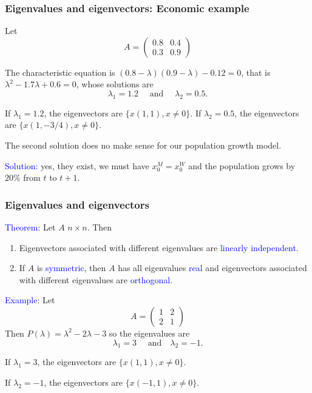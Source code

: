 \documentclass[11pt,aspectratio=169]{beamer}
\begin{document}
\begin{frame}
\frametitle{Eigenvalues and eigenvectors: Economic example}
\begin{small}
Let$$A=\begin{pmatrix}
0.8 & 0.4  \\
0.3 & 0.9
\end{pmatrix}$$

The characteristic equation is $(0.8-\lambda)(0.9-\lambda)-0.12=0$, that is $\lambda^2-1.7\lambda+0.6=0$, whose solutions  are $$\lambda_1=1.2\quad \text{ and } \quad\lambda_2=0.5.$$

If  $\lambda_1=1.2$, the eigenvectors are $\{x(1,1), x\neq 0\}$.
\vskip 10pt
If  $\lambda_2=0.5$, the eigenvectors are $\{x(1,-3/4), x\neq 0\}$.

\begin{tiny}The second solution does no make sense for our population growth model.\end{tiny}
\vskip 12pt
\textcolor{blue}{Solution:} yes, they exist, we must  have $x_0^M=x_0^ W$ and the  population grows by $20\%$ from $t$ to $t+1$.

\end{small}
\end{frame}


\begin{frame}
\frametitle{Eigenvalues and eigenvectors }
\begin{small}
\textcolor{blue}{Theorem:} Let $A$ $n \times n$. Then
\begin{enumerate}
\item Eigenvectors associated with different eigenvalues are \textcolor{blue}{linearly independent}.

\item If $A$ is \textcolor{blue}{symmetric}, then $A$ has all eigenvalues \textcolor{blue}{real} and eigenvectors associated with different eigenvalues are \textcolor{blue}{orthogonal}.
\end{enumerate}
\textcolor{blue}{Example}: Let 
$$A=\begin{pmatrix}
1 & 2  \\
2 & 1
\end{pmatrix}$$
Then $P(\lambda)=\lambda^2-2\lambda-3$ so the eigenvalues are  $$\lambda_1=3\quad \text{ and} \quad \lambda_2=-1.$$

If  $\lambda_1=3$, the eigenvectors are $\{x(1,1), x\neq 0\}$.

 If  $\lambda_2=-1$, the eigenvectors are $\{x(-1,1), x\neq 0\}$. 

\end{small}
\end{frame}
\end{document}
